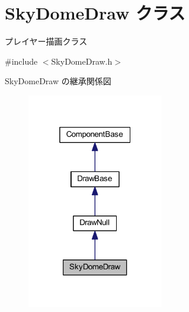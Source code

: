 \hypertarget{class_sky_dome_draw}{}\section{Sky\+Dome\+Draw クラス}
\label{class_sky_dome_draw}


プレイヤー描画クラス  




{\ttfamily \#include $<$Sky\+Dome\+Draw.\+h$>$}



Sky\+Dome\+Draw の継承関係図\nopagebreak
\begin{figure}[H]
\begin{center}
\leavevmode
\includegraphics[width=169pt]{class_sky_dome_draw__inherit__graph}
\end{center}
\end{figure}
